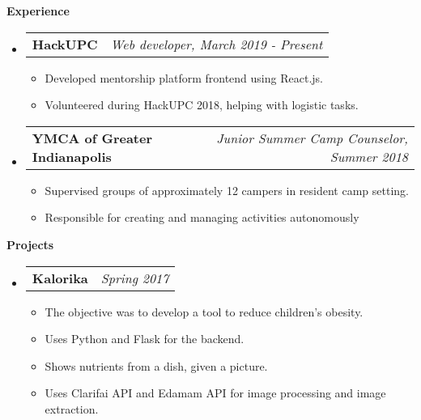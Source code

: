 \documentclass[letterpaper,12pt]{article}
\makeatletter
\newcommand{\resitem}[1]{\item #1 \vspace{-2pt}}
\newcommand{\resheading}[1]{{\large \colorbox{mygrey}{\begin{minipage}{\textwidth}{\textbf{#1 \vphantom{p\^{E}}}}\end{minipage}}}}
\newcommand{\ressubheading}[4]{
\begin{tabular*}{7.0in}{l@{\extracolsep{\fill}}r}
		\textbf{#1} & \textit{#4} \\
\end{tabular*}\vspace{-6pt}}
\makeatother
\begin{document}
\resheading{Experience}
	\begin{itemize}
		\item
			\ressubheading{HackUPC}{Barcelona, Spain}{Web developer}{Web developer, March 2019 - Present}
			\begin{itemize}
				\resitem{Developed mentorship platform frontend using React.js.}
				\resitem{Volunteered during HackUPC 2018, helping with logistic tasks.}
			\end{itemize}
		\item
			\ressubheading{YMCA of Greater Indianapolis}{St. Paul, IN}{Junior Summer Camp Counselor}{Junior Summer Camp Counselor, Summer 2018}
			\begin{itemize}
				\resitem{Supervised groups of approximately 12 campers in resident camp setting.}
				\resitem{Responsible for creating and managing activities autonomously}
			\end{itemize}

	\end{itemize}

\resheading{Projects}
	\begin{itemize}
		\item
			\ressubheading{Kalorika}{Barcelona, Spain}{Student}{Spring 2017}
			\begin{itemize}
				\resitem{The objective was to develop a tool to reduce children's obesity.}
				\resitem{Uses Python and Flask for the backend.}
				\resitem{Shows nutrients from a dish, given a picture.}
				\resitem{Uses Clarifai API and Edamam API for image processing and image extraction.}
			\end{itemize}
	\end{itemize}

\end{document}
